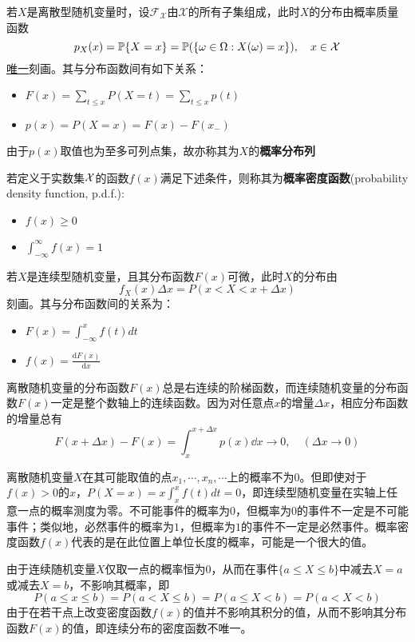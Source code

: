 若$X$是离散型随机变量时，设$\mathscr{F}_{\mathcal{X}}$由$\mathcal{X}$的所有子集组成，此时$X$的分布由概率质量函数
\[ p_{X}(x) = \P\{X=x\} = \P(\{\omega\in\Omega:X(\omega)=x\}), \quad x\in\mathcal{X} \]
\underline{唯一}刻画。其与分布函数间有如下关系：
\begin{itemize}
    \item $F(x) = \sum_{t\le x}P(X=t)=\sum_{t\le x}p(t)$
    \item $p(x)=P(X=x)=F(x)-F(x_-)$
\end{itemize}
由于$p(x)$取值也为至多可列点集，故亦称其为$X$的\textbf{概率分布列}

\begin{definition}[概率密度函数]
    若定义于实数集$\X$的函数$f(x)$满足下述条件，则称其为\textbf{概率密度函数}(probability density function, p.d.f.):
    \begin{itemize}
        \item $f(x)\ge 0$
        \item $\int_{-\infty}^{\infty}f(x)=1$
    \end{itemize}
\end{definition}

若$X$是连续型随机变量，且其分布函数$F(x)$可微，此时$X$的分布由
\[ f_{X}(x)\Delta x = P(x<X<x+\Delta x) \]
刻画。其与分布函数间的关系为：
\begin{itemize}
    \item $F(x) = \int_{-\infty}^x f(t)dt$
    \item $f(x)=\frac{\mathrm{d}F(x)}{\mathrm{d}x}$
\end{itemize}

离散随机变量的分布函数$F(x)$总是右连续的阶梯函数，而连续随机变量的分布函数$F(x)$一定是整个数轴上的连续函数。因为对任意点$x$的增量$\Delta x$，相应分布函数的增量总有
\[ F(x+\Delta x)-F(x)=\int_{x}^{x+\Delta x} p(x) \dd  x \longrightarrow 0, \quad(\Delta x \rightarrow 0) \]

离散随机变量$X$在其可能取值的点$x_1, \cdots, x_n, \cdots$上的概率不为$0$。但即使对于$f(x)>0$的$x$，$P(X=x)=x\int_{x}^x f(t)dt=0$，即连续型随机变量在实轴上任意一点的概率测度为零。不可能事件的概率为$0$，但概率为$0$的事件不一定是不可能事件；类似地，必然事件的概率为$1$，但概率为$1$的事件不一定是必然事件。概率密度函数$f(x)$代表的是在此位置上单位长度的概率，可能是一个很大的值。

由于连续随机变量$X$仅取一点的概率恒为$0$，从而在事件$\{ a \le X \le b \}$中减去$X=a$或减去$X=b$，不影响其概率，即
\[ P(a \leq x \leq b)=P(a<X \leq b)=P(a \leq X<b)=P(a<X<b) \]
由于在若干点上改变密度函数$f(x)$的值并不影响其积分的值，从而不影响其分布函数$F(x)$的值，即连续分布的密度函数不唯一。

